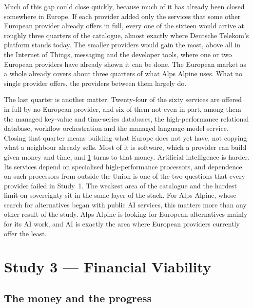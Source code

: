 Much of this gap could close quickly, because much of it has already been closed
somewhere in Europe. If each provider added only the services that some other
European provider already offers in full, every one of the sixteen would arrive at
roughly three quarters of the catalogue, almost exactly where Deutsche Telekom's
platform stands today. The smaller providers would gain the most, above all in the
Internet of Things, messaging and the developer tools, where one or two European
providers have already shown it can be done. The European market as a whole
already covers about three quarters of what Alps Alpine uses. What no single
provider offers, the providers between them largely do.

The last quarter is another matter. Twenty-four of the sixty services are offered
in full by no European provider, and six of them not even in part, among them the
managed key-value and time-series databases, the high-performance relational
database, workflow orchestration and the managed language-model service. Closing
that quarter means building what Europe does not yet have, not copying what a
neighbour already sells. Most of it is software, which a provider can build given
money and time, and \cref{sec:study3} turns to that money. Artificial intelligence
is harder. Its services depend on specialised high-performance processors, and
dependence on such processors from outside the Union is one of the two questions
that every provider failed in Study~1. The weakest area of the catalogue and the
hardest limit on sovereignty sit in the same layer of the stack. For Alps Alpine,
whose search for alternatives began with public \acs{AI} services, this matters
more than any other result of the study. Alps Alpine is looking for European
alternatives mainly for its \acs{AI} work, and \acs{AI} is exactly the area where
European providers currently offer the least.

\section{Study 3 --- Financial Viability}
\label{sec:study3}

\subsection{The money and the progress}
\label{subsec:study3-results}

